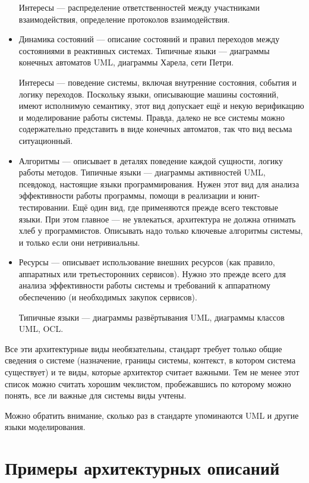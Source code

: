 \documentclass{../mcstext}
\begin{document}
\begin{itemize}
    Интересы --- распределение ответственностей между участниками взаимодействия, определение протоколов взаимодействия.
    
    \item Динамика состояний --- описание состояний и правил переходов между состояниями в реактивных системах. Типичные языки --- диаграммы конечных автоматов UML, диаграммы Харела, сети Петри.
    
    Интересы --- поведение системы, включая внутренние состояния, события и логику переходов. Поскольку языки, описывающие машины состояний, имеют исполнимую семантику, этот вид допускает ещё и некую верификацию и моделирование работы системы. Правда, далеко не все системы можно содержательно представить в виде конечных автоматов, так что вид весьма ситуационный.
    
    \item Алгоритмы --- описывает в деталях поведение каждой сущности, логику работы методов. Типичные языки --- диаграммы активностей UML, псевдокод, настоящие языки программирования. Нужен этот вид для  анализа эффективности работы программы, помощи в реализации и юнит-тестировании. Ещё один вид, где применяются прежде всего текстовые языки. При этом главное --- не увлекаться, архитектура не должна отнимать хлеб у программистов. Описывать надо только ключевые алгоритмы системы, и только если они нетривиальны.
    
    \item Ресурсы --- описывает использование внешних ресурсов (как правило, аппаратных или третьесторонних сервисов). Нужно это прежде всего для анализа эффективности работы системы и требований к аппаратному обеспечению (и необходимых закупок сервисов).
    
    Типичные языки --- диаграммы развёртывания UML, диаграммы классов UML, OCL.
\end{itemize}

Все эти архитектурные виды необязательны, стандарт требует только общие сведения о системе (назначение, границы системы, контекст, в котором система существует) и те виды, которые архитектор считает важными. Тем не менее этот список можно считать хорошим чеклистом, пробежавшись по которому можно понять, все ли важные для системы виды учтены.

Можно обратить внимание, сколько раз в стандарте упоминаются UML и другие языки моделирования.

\section{Примеры архитектурных описаний}
\end{document}
